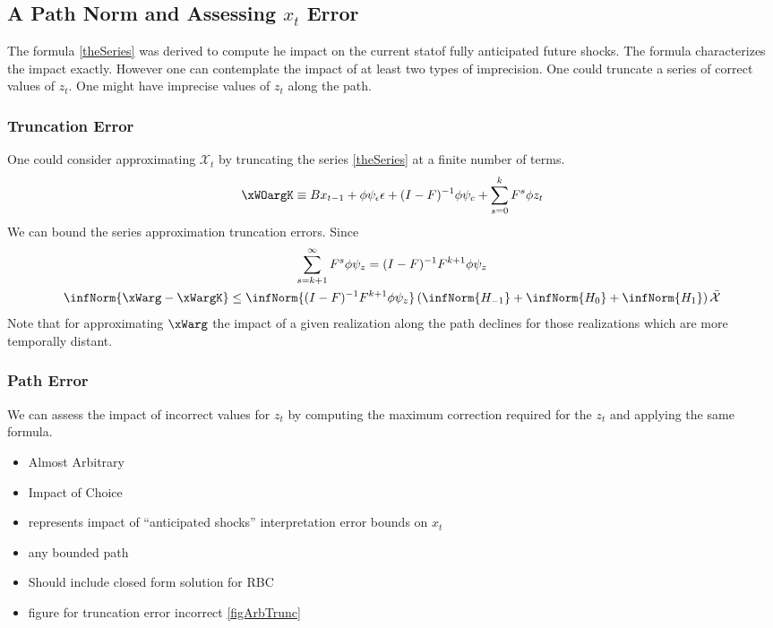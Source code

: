 \documentclass[12pt]{article}
\begin{document}
\subsection{A Path Norm and Assessing $x_t$ Error}
\label{sec:truncationerr}
The formula \ref{theSeries} was derived to compute he impact on the current statof fully anticipated future shocks.  The formula characterizes the impact exactly.  However one can contemplate the impact of at least two types of imprecision.  One could truncate a series of correct values of $z_t$.  One might have imprecise values of $z_t$ along the path.

\subsubsection{Truncation Error}


One could consider approximating $\mathcal{X}_t$ by 
truncating the series \ref{theSeries} at a finite number of terms.
 	 \begin{gather}
 	 \xWOargK \equiv B x_{t-1}+ \phi \psi_\epsilon\epsilon  + (I - F)^{-1} \phi \psi_c + \sum_{s=0}^k F^s \phi z_{t}\label{theTruncSeries}
 \end{gather}
We can bound the  series approximation truncation errors.
Since
    \begin{gather}
      \label{eq:1}
\sum_{s=k+1}^{\infty} F^s \phi \psi_z = (I -F)^{-1} F^{k+1}\phi \psi_z       \\
\infNorm{\xWarg-\xWargK} \le \infNorm{(I -F)^{-1} F^{k+1}\phi \psi_z} \left ( \infNorm{H_{-1} }+ \infNorm{H_{0} }+ \infNorm{H_{1} } \right )\bar{\mathcal{X}}
    \end{gather}
Note that for approximating $\xWarg$ the impact of  a given realization along the path declines for those realizations which are  more temporally distant.



\subsubsection{Path Error}


We can assess the impact of incorrect values for $z_t$ by computing the maximum correction required for the $z_t$ and applying the 
same formula.


\label{sec:pathnorm}

\begin{itemize}
\item Almost Arbitrary
\item Impact of Choice
\item represents impact of ``anticipated shocks'' interpretation error bounds on $x_t$
\item any bounded path
\item Should include closed form solution for RBC
\item figure for truncation error incorrect \ref{figArbTrunc}
\end{itemize}
\end{document}
